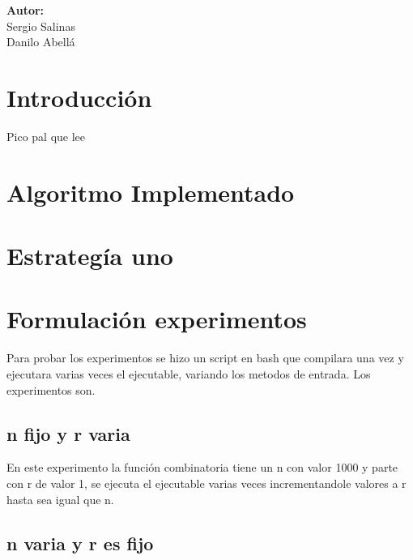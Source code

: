 \documentclass[12pt,letterpaper]{scrartcl}
\begin{document}
\begin{titlepage}
\begin{center}
\begin{minipage}[l]{0.4\textwidth}
	\begin{flushright}

		\textbf{\textsf{Autor:}}\\
		\linespread{1}
		\large Sergio Salinas\\
		\large Danilo Abellá\\

	\end{flushright}
\end{minipage}

\end{center}

\end{titlepage}

\section*{Introducción}

Pico pal que lee
\section{Algoritmo Implementado}

\section{Estrategía uno}

\begin{algorithm}[H]
	
 }
 \caption{How to write algorithms}
\end{algorithm}


\section{Formulación experimentos}

Para probar los experimentos se hizo un script en bash que compilara una vez y ejecutara varias veces el ejecutable, variando los metodos de entrada. Los experimentos son.

\subsection{n fijo y r varia}

En este experimento la función combinatoria tiene un n con valor 1000 y parte con r de valor 1, se ejecuta el ejecutable varias veces incrementandole valores a r hasta sea igual que n.

\subsection{n varia y r es fijo}
\end{document}
